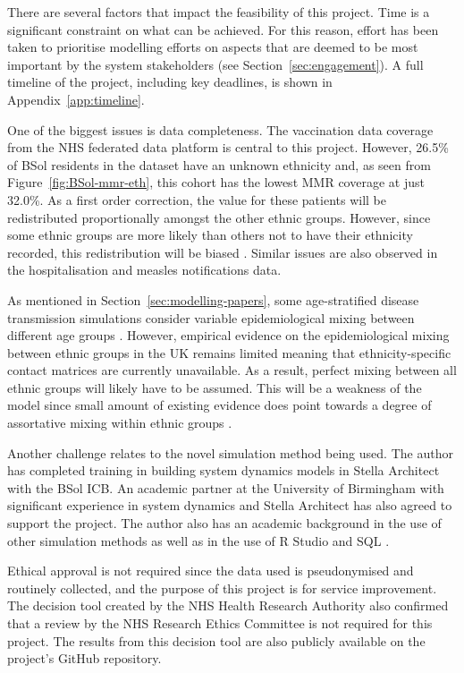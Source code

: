 \documentclass{article}
\begin{document}
There are several factors that impact the feasibility of this project. Time is a significant constraint on what can be achieved. For this reason, effort has been taken to prioritise modelling efforts on aspects that are deemed to be most important by the system stakeholders (see Section~\ref{sec:engagement}). A full timeline of the project, including key deadlines, is shown in Appendix~\ref{app:timeline}.

One of the biggest issues is data completeness. The vaccination data coverage from the NHS federated data platform is central to this project. However, 26.5\% of BSol residents in the dataset have an unknown ethnicity and, as seen from Figure~\ref{fig:BSol-mmr-eth}, this cohort has the lowest MMR coverage at just 32.0\%. As a first order correction, the value for these patients will be redistributed proportionally amongst the other ethnic groups. However, since some ethnic groups are more likely than others not to have their ethnicity recorded, this redistribution will be biased \cite{mathur2014completeness}. Similar issues are also observed in the hospitalisation and measles notifications data.

As mentioned in Section~\ref{sec:modelling-papers}, some age-stratified disease transmission simulations consider variable epidemiological mixing between different age groups \cite{NextGenFluModelling}. However, empirical evidence on the epidemiological mixing between ethnic groups in the UK remains limited meaning that ethnicity-specific contact matrices are currently unavailable. As a result, perfect mixing between all ethnic groups will likely have to be assumed. This will be a weakness of the model since small amount of existing evidence does point towards a degree of assortative mixing within ethnic groups \cite{vynnycky2019mycobacterium, le2019hiv}.

Another challenge relates to the novel simulation method being used. The author has completed training in building system dynamics models in Stella Architect with the BSol ICB. An academic partner at the University of Birmingham with significant experience in system dynamics and Stella Architect has also agreed to support the project. The author also has an academic background in the use of other simulation methods as well as in the use of R Studio and SQL \cite{ellis2021axion, Ellis_2022, EllisThesis2022, marsh2024dark, 10.3389/fpubh.2025.1544903, 10.3389/fpubh.2024.1477418}.

Ethical approval is not required since the data used is pseudonymised and routinely collected, and the purpose of this project is for service improvement. The decision tool created by the NHS Health Research Authority also confirmed that a review by the NHS Research Ethics Committee is not required for this project. The results from this decision tool are also publicly available on the project’s GitHub repository.
\end{document}
